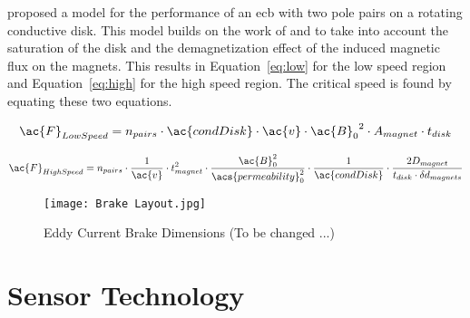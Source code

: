 \cite{Baum:2016} proposed a model for the performance of an \ac{ecb} with two pole pairs on a rotating conductive disk. This model builds on the work of \cite{Smythe:1950} and \cite{Wouterse:1991} to take into account the saturation of the disk and the demagnetization effect of the induced magnetic flux on the magnets. This results in Equation~\ref{eq:low} for the low speed region and Equation~\ref{eq:high} for the high speed region. The critical speed is found by equating these two equations.

\begin{equation}
	\ac{F}_{Low Speed} = n_{pairs} \cdot \ac{condDisk} \cdot \ac{v} \cdot {\ac{B}_0}^2 \cdot A_{magnet} \cdot t_{disk}
	\label{eq:low}
\end{equation}

\begin{equation}
	\ac{F}_{High Speed} = n_{pairs} \cdot \frac{1}{\ac{v}} \cdot t_{magnet}^2 \cdot \frac{\ac{B}_0^2}{\acs{permeability}_0^2} \cdot \frac{1}{\ac{condDisk}} \cdot \frac{2 D_{magnet}}{t_{disk} \cdot \delta d_{magnets}}
	\label{eq:high}
\end{equation}

\begin{figure}[H]
	\begin{center}
		\texttt{[image: Brake Layout.jpg]}
		\caption{Eddy Current Brake Dimensions (To be changed ...)}
		\label{fig:EB}
	\end{center}
\end{figure}

\newpage

\section{Sensor Technology}

\newpage

